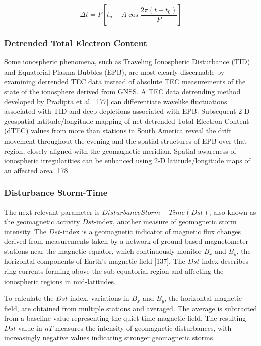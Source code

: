 \documentclass[sn-mathphys-num]{sn-jnl}%
\begin{document}
\begin{equation}
	\Delta t = F \left[ t_{n} + A \cos \frac{2\pi\left(t-t_{0}\right)}{P} \right]
	\label{eqn:15}
\end{equation}

\subsubsection{Detrended Total Electron Content}

Some ionospheric phenomena, such as Traveling Ionospheric Disturbance (TID) and Equatorial Plasma Bubbles (EPB), are most clearly discernable by examining detrended TEC data instead of absolute TEC measurements of the state of the ionosphere derived from GNSS. A TEC data detrending method developed by Pradipta et al. [177] can differentiate wavelike fluctuations associated with TID and deep depletions associated with EPB. Subsequent 2-D geospatial latitude/longitude mapping of net detrended Total Electron Content (dTEC) values from more than stations in South America reveal the drift movement throughout the evening and the spatial structures of EPB over that region, closely aligned with the geomagnetic meridian. Spatial awareness of ionospheric irregularities can be enhanced using 2-D latitude/longitude maps of an affected area [178].

\subsubsection{Disturbance Storm-Time}

The next relevant parameter is $Disturbance Storm-Time (Dst)$, also known as the geomagnetic activity $Dst$-index, another measure of geomagnetic storm intensity. The $Dst$-index is a geomagnetic indicator of magnetic flux changes derived from measurements taken by a network of ground-based magnetometer stations near the magnetic equator, which continuously monitor $B_{x}$ and $B_{y}$, the horizontal components of Earth's magnetic field [137]. The $Dst$-index describes ring currents forming above the sub-equatorial region and affecting the ionospheric regions in mid-latitudes.

To calculate the $Dst$-index, variations in $B_{x}$ and $B_{y}$, the horizontal magnetic field, are obtained from multiple stations and averaged. The average is subtracted from a baseline value representing the quiet-time magnetic field. The resulting $Dst$ value in $nT$ measures the intensity of geomagnetic disturbances, with increasingly negative values indicating stronger geomagnetic storms. 
\end{document}
